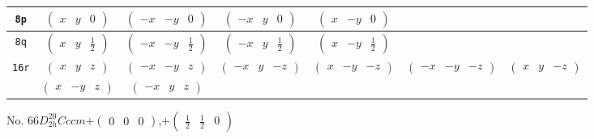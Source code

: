 \documentclass[fleqn,9pt,landscape]{jsarticle}
\begin{document}
\begin{center}
\begin{longtable}{ccccccc}
{\tt 8p} & $ \begin{pmatrix} x & y & 0 \end{pmatrix} $ & $ \begin{pmatrix} - x & - y & 0 \end{pmatrix} $ & $ \begin{pmatrix} - x & y & 0 \end{pmatrix} $ & $ \begin{pmatrix} x & - y & 0 \end{pmatrix} $ & $  $ & $  $ \\ \hline
{\tt 8q} & $ \begin{pmatrix} x & y & \frac{1}{2} \end{pmatrix} $ & $ \begin{pmatrix} - x & - y & \frac{1}{2} \end{pmatrix} $ & $ \begin{pmatrix} - x & y & \frac{1}{2} \end{pmatrix} $ & $ \begin{pmatrix} x & - y & \frac{1}{2} \end{pmatrix} $ & $  $ & $  $ \\ \hline
{\tt 16r} & $ \begin{pmatrix} x & y & z \end{pmatrix} $ & $ \begin{pmatrix} - x & - y & z \end{pmatrix} $ & $ \begin{pmatrix} - x & y & - z \end{pmatrix} $ & $ \begin{pmatrix} x & - y & - z \end{pmatrix} $ & $ \begin{pmatrix} - x & - y & - z \end{pmatrix} $ & $ \begin{pmatrix} x & y & - z \end{pmatrix} $ \\
& $ \begin{pmatrix} x & - y & z \end{pmatrix} $ & $ \begin{pmatrix} - x & y & z \end{pmatrix} $ & $  $ & $  $ & $  $ & $  $ \\
\end{longtable}
\end{center}
\newpage
No. 66\quad$D_{2h}^{20}$\quad$Cccm$\quad[ orthorhombic ]\quad$+\begin{pmatrix} 0 & 0 & 0 \end{pmatrix}$,\quad $+\begin{pmatrix} \frac{1}{2} & \frac{1}{2} & 0 \end{pmatrix}$
\end{document}
